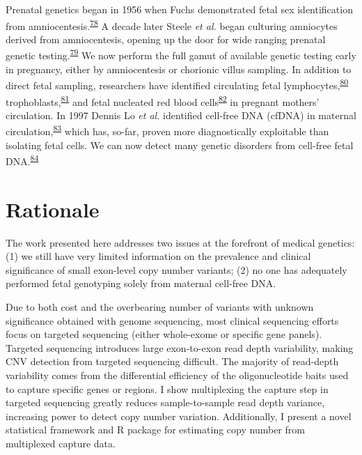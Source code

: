 \documentclass[11pt,letterpaper,oneside]{book}
\begin{document}
Prenatal genetics began in 1956 when Fuchs demonstrated fetal sex identification from amniocentesis.\textsuperscript{\protect\hyperlink{ref-fuchs:1956aa}{78}}
A decade later Steele \emph{et al.} began culturing amniocytes derived from amniocentesis, opening up the door for wide ranging prenatal genetic testing.\textsuperscript{\protect\hyperlink{ref-steele:1966aa}{79}}
We now perform the full gamut of available genetic testing early in pregnancy, either by amniocentesis or chorionic villus sampling.
In addition to direct fetal sampling, researchers have identified circulating fetal lymphocytes,\textsuperscript{\protect\hyperlink{ref-walknowska:1969aa}{80}} trophoblasts,\textsuperscript{\protect\hyperlink{ref-mueller:1990aa}{81}} and fetal nucleated red blood cells\textsuperscript{\protect\hyperlink{ref-bianchi:1990aa}{82}} in pregnant mothers' circulation.
In 1997 Dennis Lo \emph{et al.} identified cell-free DNA (cfDNA) in maternal circulation,\textsuperscript{\protect\hyperlink{ref-lo:1997aa}{83}} which has, so-far, proven more diagnostically exploitable than isolating fetal cells.
We can now detect many genetic disorders from cell-free fetal DNA.\textsuperscript{\protect\hyperlink{ref-scotchman:2020aa}{84}}

\hypertarget{prob}{%
\section{Rationale}\label{prob}}

The work presented here addresses two issues at the forefront of medical genetics: (1) we still have very limited information on the prevalence and clinical significance of small exon-level copy number variants; (2) no one has adequately performed fetal genotyping solely from maternal cell-free DNA.

Due to both cost and the overbearing number of variants with unknown significance obtained with genome sequencing, most clinical sequencing efforts focus on targeted sequencing (either whole-exome or specific gene panels).
Targeted sequencing introduces large exon-to-exon read depth variability, making CNV detection from targeted sequencing difficult.
The majority of read-depth variability comes from the differential efficiency of the oligonucleotide baits used to capture specific genes or regions.
I show multiplexing the capture step in targeted sequencing greatly reduces sample-to-sample read depth variance, increasing power to detect copy number variation.
Additionally, I present a novel statistical framework and R package for estimating copy number from multiplexed capture data.
\end{document}
